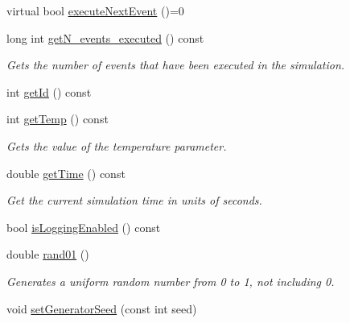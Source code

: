 \begin{DoxyCompactItemize}
virtual bool \hyperlink{class_simulation_a48e9e82f9dac1acec5d063a9f6f6115e}{execute\+Next\+Event} ()=0
\item 
\mbox{\label{class_simulation_a52cb5564151421cbefaca56357738de7}} 
long int \hyperlink{class_simulation_a52cb5564151421cbefaca56357738de7}{get\+N\+\_\+events\+\_\+executed} () const
\begin{DoxyCompactList}\small\item\em Gets the number of events that have been executed in the simulation. \end{DoxyCompactList}\item 
int \hyperlink{class_simulation_aff40f268758bd9a0f390a649fc45c05e}{get\+Id} () const
\item 
\mbox{\label{class_simulation_ac00bce7c792fb67a75395c46c03efe0a}} 
int \hyperlink{class_simulation_ac00bce7c792fb67a75395c46c03efe0a}{get\+Temp} () const
\begin{DoxyCompactList}\small\item\em Gets the value of the temperature parameter. \end{DoxyCompactList}\item 
\mbox{\label{class_simulation_a391ac262089c8bda8e76ce930b1db88b}} 
double \hyperlink{class_simulation_a391ac262089c8bda8e76ce930b1db88b}{get\+Time} () const
\begin{DoxyCompactList}\small\item\em Get the current simulation time in units of seconds. \end{DoxyCompactList}\item 
bool \hyperlink{class_simulation_ac7c8a49a4cc506b850891480e0aae512}{is\+Logging\+Enabled} () const
\item 
\mbox{\label{class_simulation_a938de951b2766c6fb2b00cf9714caffa}} 
double \hyperlink{class_simulation_a938de951b2766c6fb2b00cf9714caffa}{rand01} ()
\begin{DoxyCompactList}\small\item\em Generates a uniform random number from 0 to 1, not including 0. \end{DoxyCompactList}\item 
void \hyperlink{class_simulation_a1a825b9da67da43104137662694655bd}{set\+Generator\+Seed} (const int seed)
\end{DoxyCompactItemize}
